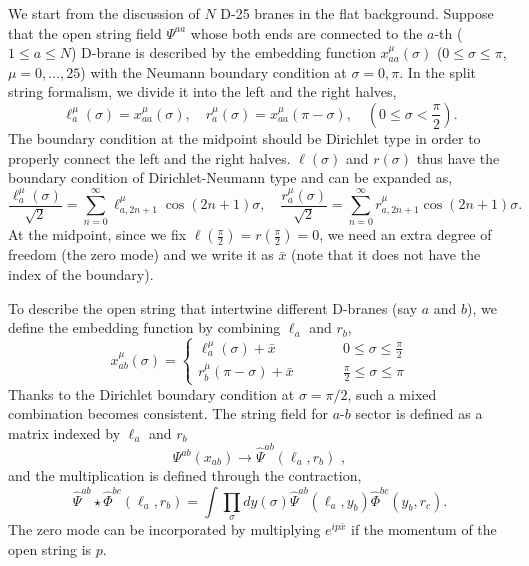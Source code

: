 \documentclass[a4paper,12pt]{article}
\begin{document}
We start from the discussion of $N$ D-25 branes
in the flat background.
Suppose that the open string field
$\Psi^{aa}$ whose both ends are connected to the $a$-th
($1\leq a \leq N$)
D-brane is described by the embedding function 
$x_{aa}^\mu(\sigma)$ ($0\leq \sigma \leq \pi$, $\mu=0,\dots,25$)
with the Neumann boundary condition at $\sigma=0,\pi$.
In the split string formalism, 
we divide it into the left and the right halves,
\begin{equation}
 \ell_a^\mu(\sigma)=x_{aa}^\mu(\sigma),\quad
 r_a^\mu(\sigma)=x_{aa}^\mu(\pi-\sigma),
 \quad (0\leq\sigma< \frac{\pi}{2}).
\end{equation}
The boundary condition at the midpoint should be
Dirichlet type in order to properly connect the left and the right halves.
$\ell(\sigma)$ and $r(\sigma)$ thus have the boundary condition
of Dirichlet-Neumann type and can be expanded as,
\begin{equation}
 \frac{\ell_a^\mu(\sigma)}{\sqrt{2}}=\sum_{n=0}^\infty \ell_{a, 2n+1}^\mu
\cos(2n+1)\sigma,\quad
 \frac{r_a^\mu(\sigma)}{\sqrt{2}}=\sum_{n=0}^\infty r_{a, 2n+1}^\mu
\cos(2n+1)\sigma.
\end{equation}
At the midpoint, since we fix $\ell(\frac{\pi}{2})=r(\frac{\pi}{2})=0$,
we need an extra degree of freedom (the zero mode) and we write it
as $\bar{x}$ (note that it does not have the index of the boundary).

To describe the open string that intertwine different D-branes
(say $a$ and $b$), we define the embedding function
by combining $\ell_a$ and $r_b$,
\begin{equation}\label{e-xab}
 x_{ab}^\mu(\sigma)=\left\{
\begin{array}{ll}
 \ell_a^\mu(\sigma)+\bar x\qquad\qquad&0\leq\sigma\leq \frac{\pi}{2}\\
 r_b^\mu(\pi-\sigma)+\bar x& \frac{\pi}{2}\leq \sigma \leq\pi
\end{array}
\right.
\end{equation}
Thanks to the Dirichlet boundary condition at $\sigma=\pi/2$,
such a mixed combination becomes consistent.
The string field for $a$-$b$ sector is defined as a
matrix indexed by $\ell_a$ and $r_b$
\begin{equation}
 \Psi^{ab}(x_{ab})\rightarrow \hat\Psi^{ab}(\ell_a,r_b)\,\,,
\end{equation}
and the multiplication is defined through the contraction,
\begin{equation}\label{e-multiplication}
 \hat\Psi^{ab}\star\hat\Phi^{bc}(\ell_a,r_b)
 = \int  \prod_{\sigma}dy(\sigma)
 \hat\Psi^{ab}(\ell_a,y_b)\hat\Phi^{bc}(y_b,r_c).
\end{equation}
The zero mode can be incorporated by multiplying
$e^{ip\bar x}$ if the momentum of the open string is $p$.
\end{document}
